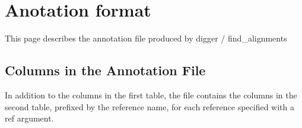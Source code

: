 \documentclass[letterpaper,10pt,english]{sphinxmanual}
\begin{document}
\sphinxstepscope


\chapter{Anotation format}
\label{\detokenize{tools/annotation:anotation-format}}\label{\detokenize{tools/annotation:annotation}}\label{\detokenize{tools/annotation::doc}}
\sphinxAtStartPar
This page describes the annotation file produced by digger / find\_alignments


\section{Columns in the Annotation File}
\label{\detokenize{tools/annotation:columns-in-the-annotation-file}}
\sphinxAtStartPar
In addition to the columns in the first table, the file contains the columns in the second table, prefixed by the reference name, for each reference specified with a \sphinxhyphen{}ref argument.
\end{document}

